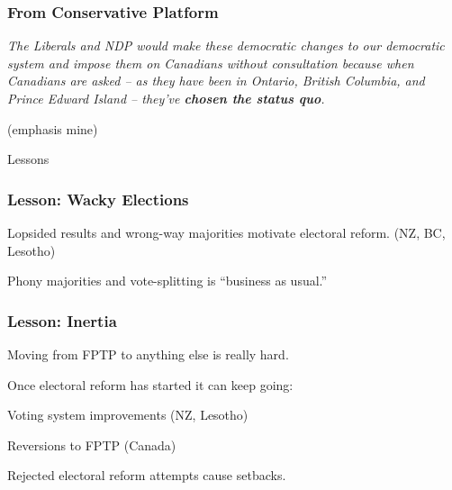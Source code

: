 \documentclass[14pt,t,hyperref={colorlinks=true,urlcolor=red}]{beamer}
\newcommand{\spooky}[1]{{\Huge \fontfamily{lgfz}\fontseries{m}\fontshape{n} \selectfont #1}}
\newcommand{\bigspookytext}[1]
{
\vspace{\stretch{1}}
\begin{center}
\spooky{#1}
\end{center}
\vspace{\stretch{1}}
}
\begin{document}

\begin{frame}
\frametitle{From Conservative Platform}

\textit{
The Liberals and NDP would make these democratic changes to our
democratic system and impose them on Canadians without consultation
because when Canadians are asked -- as they have been in
Ontario, British Columbia, and Prince Edward Island -- they've
\textbf{chosen the status quo}. 
}

\small{(emphasis mine)}

\end{frame}


\begin{frame}

\bigspookytext{Lessons}

\end{frame}




\begin{frame}
\frametitle{Lesson: Wacky Elections}

Lopsided results and wrong-way majorities motivate electoral reform.
(NZ, BC, Lesotho)

Phony majorities and vote-splitting is ``business as usual.''

\end{frame}


\begin{frame}
\frametitle{Lesson: Inertia}

Moving from FPTP to anything else is really hard.

Once electoral reform has started it can keep going:
\begin{itemize*}

\item Voting system improvements (NZ, Lesotho)

\item Reversions to FPTP (Canada)

\end{itemize*}

Rejected electoral reform attempts cause setbacks.

\end{frame}

\end{document}
